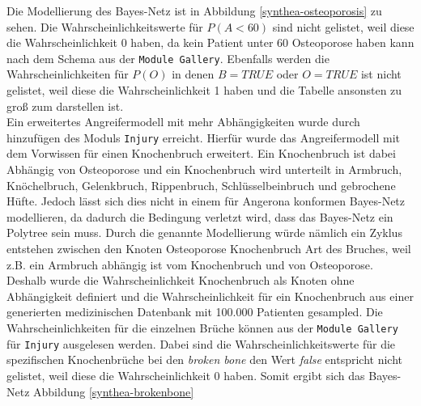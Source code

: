 \documentclass[german,version-2020-11]{uzl-thesis}
\begin{document}
Die Modellierung des Bayes-Netz ist in Abbildung \ref{synthea-osteoporosis} zu sehen. Die Wahrscheinlichkeitswerte für $P(A < 60)$ sind nicht gelistet, weil diese die Wahrscheinlichkeit 0 haben, da kein Patient unter 60 Osteoporose haben kann nach dem Schema aus der \texttt{Module Gallery}. Ebenfalls werden die Wahrscheinlichkeiten für $P(O)$ in denen $B=TRUE$ oder $O=TRUE$ ist nicht gelistet, weil diese die Wahrscheinlichkeit 1 haben und die Tabelle ansonsten zu groß zum darstellen ist.\\
Ein erweitertes Angreifermodell mit mehr Abhängigkeiten wurde durch hinzufügen des Moduls \texttt{Injury} erreicht. Hierfür wurde das Angreifermodell mit dem Vorwissen für einen Knochenbruch erweitert. Ein Knochenbruch ist dabei Abhängig von Osteoporose und ein Knochenbruch wird unterteilt in Armbruch, Knöchelbruch, Gelenkbruch, Rippenbruch, Schlüsselbeinbruch und gebrochene Hüfte. Jedoch lässt sich dies nicht in einem für Angerona konformen Bayes-Netz modellieren, da dadurch die Bedingung verletzt wird, dass das Bayes-Netz ein Polytree sein muss. Durch die genannte Modellierung würde nämlich ein Zyklus entstehen zwischen den Knoten Osteoporose \leftrightarrow Knochenbruch \leftrightarrow Art des Bruches, weil z.B. ein Armbruch abhängig ist vom Knochenbruch und von Osteoporose. 
Deshalb wurde die Wahrscheinlichkeit Knochenbruch als Knoten ohne Abhängigkeit definiert und die Wahrscheinlichkeit für ein Knochenbruch aus einer generierten medizinischen Datenbank mit 100.000 Patienten gesampled. Die Wahrscheinlichkeiten für die einzelnen Brüche können aus der \texttt{Module Gallery} für \texttt{Injury} ausgelesen werden. Dabei sind die Wahrscheinlichkeitswerte für die spezifischen Knochenbrüche bei den \textit{broken bone} den Wert \textit{false} entspricht nicht gelistet, weil diese die Wahrscheinlichkeit 0 haben. Somit ergibt sich das Bayes-Netz Abbildung \ref{synthea-brokenbone}
\end{document}
